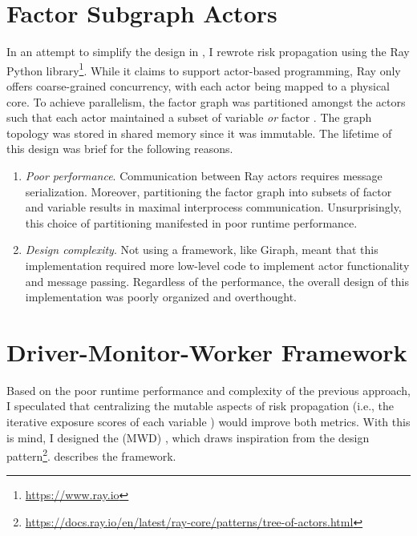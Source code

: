 \section{Factor Subgraph Actors}\label{sec:subgraph-actors}

In an attempt to simplify the design in , I rewrote risk propagation using the Ray Python library\footnote{\url{https://www.ray.io}}. While it claims to support actor-based programming, Ray only offers coarse-grained concurrency, with each actor being mapped to a physical core. To achieve parallelism, the factor graph was partitioned amongst the actors such that each actor maintained a subset of variable \verticesName{} \emph{or} factor \verticesName. The graph topology was stored in shared memory since it was immutable. The lifetime of this design was brief for the following reasons.
  \begin{enumerate}
    \item \emph{Poor performance}. Communication between Ray actors requires message serialization. Moreover, partitioning the factor graph into subsets of factor \verticesName{} and variable \verticesName{} results in maximal interprocess communication. Unsurprisingly, this choice of partitioning manifested in poor runtime performance.
    \item \emph{Design complexity}. Not using a framework, like Giraph, meant that this implementation required more low-level code to implement actor functionality and message passing. Regardless of the performance, the overall design of this implementation was poorly organized and overthought.
  \end{enumerate}

\section{Driver-Monitor-Worker Framework}\label{sec:mwd-framework}

Based on the poor runtime performance and complexity of the previous approach, I speculated that centralizing the mutable aspects of risk propagation (i.e., the iterative exposure scores of each variable \vertexName) would improve both metrics. With this is mind, I designed the  (MWD) , which draws inspiration from the  design pattern\footnote{\url{https://docs.ray.io/en/latest/ray-core/patterns/tree-of-actors.html}}.  describes the framework.

